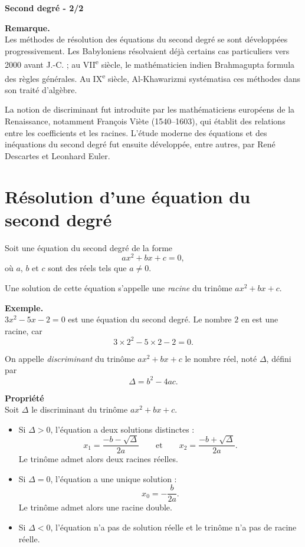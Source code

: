 \documentclass[11pt]{article}
\newenvironment{remarque}{\par\smallskip\noindent\textbf{Remarque. \\}\ignorespaces}{\par\smallskip}
\newenvironment{exemple}{\par\smallskip\noindent\textbf{Exemple. \\}\ignorespaces}{\par\smallskip}
\begin{document}
\begin{definition}
\begin{center}
    {\Huge\bfseries Second degré - 2/2}
\end{center}
\end{definition}

\begin{remarque}
Les méthodes de résolution des équations du second degré se sont développées progressivement. Les Babyloniens résolvaient déjà certains cas particuliers vers 2000 avant J.-C. ; au VII\textsuperscript{e} siècle, le mathématicien indien Brahmagupta formula des règles générales. Au IX\textsuperscript{e} siècle, Al-Khawarizmi systématisa ces méthodes dans son traité d'algèbre.

La notion de discriminant fut introduite par les mathématiciens européens de la Renaissance, notamment François Viète (1540--1603), qui établit des relations entre les coefficients et les racines. L'étude moderne des équations et des inéquations du second degré fut ensuite développée, entre autres, par René Descartes et Leonhard Euler.
\end{remarque}

\section{Résolution d'une équation du second degré}

\begin{definition}
Soit une équation du second degré de la forme
\[
ax^2+bx+c=0,
\]
où $a$, $b$ et $c$ sont des réels tels que $a\neq 0$.

Une solution de cette équation s'appelle une \emph{racine} du trinôme $ax^2+bx+c$.
\end{definition}

\begin{exemple}
$3x^2-5x-2=0$ est une équation du second degré. Le nombre $2$ en est une racine, car
\[
3\times 2^2-5\times 2-2=0.
\]
\end{exemple}

\begin{definition}
On appelle \emph{discriminant} du trinôme $ax^2+bx+c$ le nombre réel, noté $\Delta$, défini par
\[
\Delta=b^2-4ac.
\]
\end{definition}

\begin{propriete}
\textbf{Propriété}\\
Soit $\Delta$ le discriminant du trinôme $ax^2+bx+c$.
\begin{itemize}
    \item Si $\Delta>0$, l'équation a deux solutions distinctes :
    \[
    x_1=\frac{-b-\sqrt{\Delta}}{2a}
    \qquad\text{et}\qquad
    x_2=\frac{-b+\sqrt{\Delta}}{2a}.
    \]
    Le trinôme admet alors deux racines réelles.
    \item Si $\Delta=0$, l'équation a une unique solution :
    \[
    x_0=-\frac{b}{2a}.
    \]
    Le trinôme admet alors une racine double.
    \item Si $\Delta<0$, l'équation n'a pas de solution réelle et le trinôme n'a pas de racine réelle.
\end{itemize}
\end{propriete}
\end{document}
